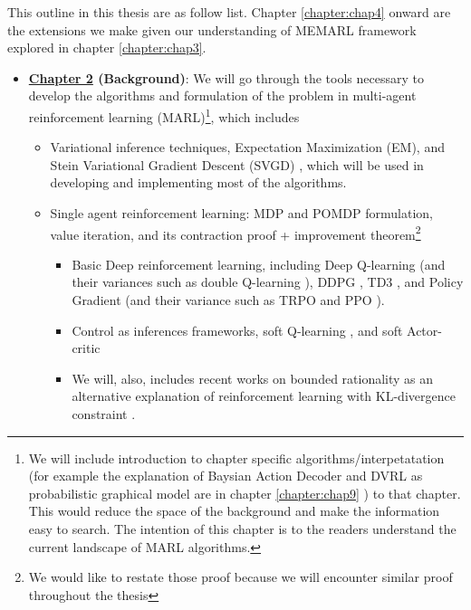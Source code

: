 \label{sec:chap1-Outline}
This outline in this thesis are as follow list. Chapter \ref{chapter:chap4} onward are the extensions we make given our understanding of MEMARL framework explored in chapter \ref{chapter:chap3}.
\begin{itemize}
    \item \textbf{\hyperref[chapter:chap2]{Chapter 2} (Background)}: We will go through the tools necessary to develop the algorithms and formulation of the problem in multi-agent reinforcement learning (MARL)\footnote{We will include introduction to chapter specific algorithms/interpetatation (for example the explanation of Baysian Action Decoder \cite{foerster2018bayesian} and DVRL as probabilistic graphical model \cite{shvechikovjoint} are in chapter \ref{chapter:chap9} ) to that chapter. This would reduce the space of the background and make the information easy to search. The intention of this chapter is to the readers understand the current landscape of MARL algorithms.}, which includes 
    \begin{itemize}
        \item Variational inference techniques, Expectation Maximization (EM), and Stein Variational Gradient Descent (SVGD) \cite{liu2016stein}, which will be used in developing and implementing most of the algorithms.
        \item Single agent reinforcement learning: MDP and POMDP formulation, value iteration, and its contraction proof + improvement theorem\footnote{We would like to restate those proof because we will encounter similar proof throughout the thesis}
        \begin{itemize}
            \item Basic Deep reinforcement learning, including Deep Q-learning \cite{mnih2015human} (and their variances such as double Q-learning \cite{van2016deep}), DDPG \cite{lillicrap2015continuous}, TD3 \cite{fujimoto2018addressing}, and Policy Gradient \cite{sutton2000policy} (and their variance such as TRPO \cite{schulman2015trust} and PPO \cite{schulman2017proximal}).
            \item Control as inferences frameworks, soft Q-learning \cite{haarnoja2017reinforcement}, and soft Actor-critic \cite{haarnoja2018softa, haarnoja2018softb}
            \item We will, also, includes recent works on bounded rationality as an alternative explanation of reinforcement learning with KL-divergence constraint \cite{ortega2013thermodynamics, tim2015bounded}.
        \end{itemize}

\end{itemize}
\end{itemize}
